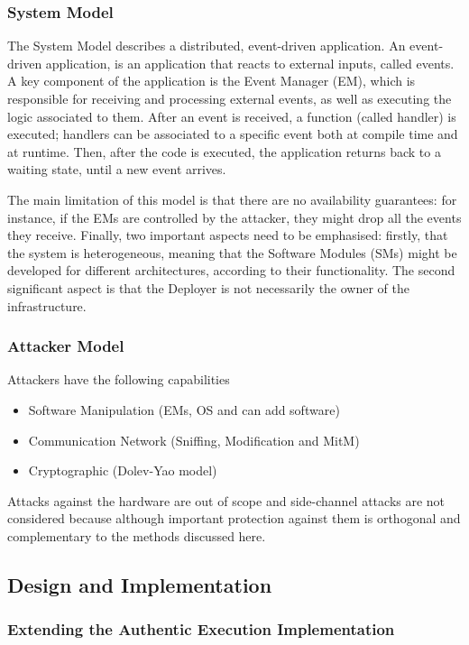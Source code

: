 \documentclass{article}
\begin{document}
\subsubsection{System Model}

The System Model describes a distributed, event-driven application. An event-driven application, is an application that reacts to external inputs, called events. A key component of the application is the Event Manager (EM), which is responsible for receiving and processing external events, as well as executing the logic associated to them. After an event is received, a function (called handler) is executed; handlers can be associated to a specific event both at compile time and at runtime. Then, after the code is executed, the application returns back to a waiting state, until a new event arrives.
\medskip

The main limitation of this model is that there are no availability guarantees: for instance, if the EMs are controlled by the attacker, they might drop all the events they receive. Finally, two important aspects need to be emphasised: firstly, that the system is heterogeneous, meaning that the Software Modules (SMs) might be developed for different architectures, according to their functionality. The second significant aspect is that the Deployer is not necessarily the owner of the infrastructure.

\subsubsection{Attacker Model}

Attackers have the following capabilities \begin{itemize}
\item Software Manipulation (EMs, OS and can add software)
\item Communication Network (Sniffing, Modification and MitM)
\item Cryptographic (Dolev-Yao model)
\end{itemize}
Attacks against the hardware are out of scope and side-channel attacks are not considered because although important protection against them is orthogonal and complementary to the methods discussed here.

\subsection{Design and Implementation}

\subsubsection{Extending the Authentic Execution Implementation}
\end{document}
